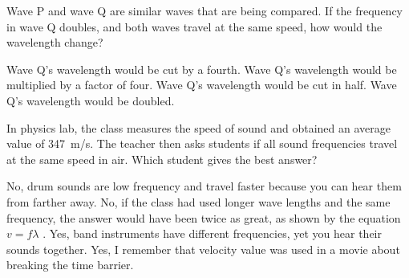 \documentclass[answers]{exam}
\begin{document}
\begin{questions}

\question 
Wave P and wave Q are similar waves that are being compared. If the frequency in wave Q doubles, and both waves travel at the same speed, how would the wavelength change?

\begin{randomizechoices}
    \choice Wave Q's wavelength would be cut by a fourth.
    \choice Wave Q's wavelength would be multiplied by a factor of four.
    \correctchoice Wave Q's wavelength would be cut in half.
    \choice Wave Q's wavelength would be doubled.
\end{randomizechoices}

\question
In physics lab, the class measures the speed of sound and obtained an average value of \SI{347}{m/s}. The teacher then asks students if all sound frequencies travel at the same speed in air. Which student gives the best answer?

\begin{randomizechoices}
    \choice No, drum sounds are low frequency and travel faster because you can hear them from farther away.
    \choice No, if the class had used longer wave lengths and the same frequency, the answer would have been twice as great, as shown by the equation $v = f \lambda$ .
    \correctchoice Yes, band instruments have different frequencies, yet you hear their\\sounds together.
    \choice Yes, I remember that velocity value was used in a movie about breaking the time barrier.
\end{randomizechoices}




\end{questions}
\end{document}
